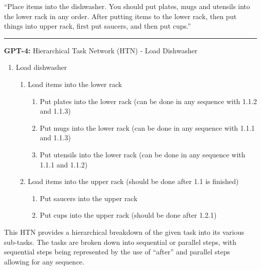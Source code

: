 \documentclass{article}
\begin{document}
``Place items into the dishwasher. You should put plates, mugs and utensils into the lower rack in any order. After putting items to the lower rack, then put things into upper rack, first put saucers, and then put cups.''

\noindent\rule{16cm}{0.4pt}

\textbf{GPT-4:}
Hierarchical Task Network (HTN) - Load Dishwasher
\begin{enumerate}[label=\arabic*.]
    \item Load dishwasher
    \begin{enumerate}[label=\arabic{enumi}.\arabic*]
        \item Load items into the lower rack
        \begin{enumerate}[label=\arabic{enumi}.\arabic{enumii}.\arabic*]
            \item Put plates into the lower rack (can be done in any sequence with 1.1.2 and 1.1.3)
            \item Put mugs into the lower rack (can be done in any sequence with 1.1.1 and 1.1.3)
            \item Put utensils into the lower rack (can be done in any sequence with 1.1.1 and 1.1.2)
        \end{enumerate}
        \item Load items into the upper rack (should be done after 1.1 is finished)
        \begin{enumerate}[label=\arabic{enumi}.\arabic{enumii}.\arabic*]
            \item Put saucers into the upper rack 
            \item Put cups into the upper rack (should be done after 1.2.1)
        \end{enumerate}
    \end{enumerate}
\end{enumerate}

{This HTN provides a hierarchical breakdown of the given task into its various sub-tasks. The tasks are broken down into sequential or parallel steps, with sequential steps being represented by the use of ``after'' and parallel steps allowing for any sequence.}
\end{document}
